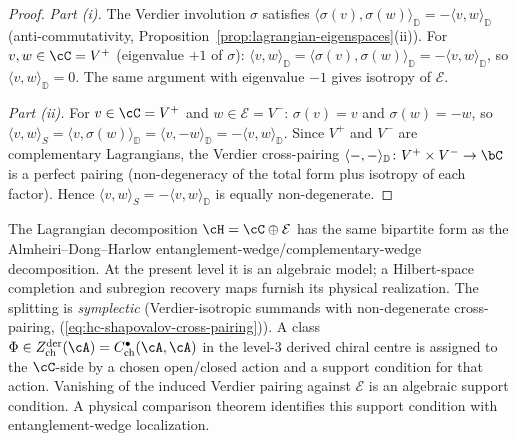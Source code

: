 \begin{proof}
\emph{Part (i).}
The Verdier involution $\sigma$ satisfies
$\langle \sigma(v), \sigma(w) \rangle_{\mathbb{D}} =
-\langle v, w \rangle_{\mathbb{D}}$
(anti-commutativity,
Proposition~\ref{prop:lagrangian-eigenspaces}(ii)).
For $v, w \in \cC = V^+$ (eigenvalue $+1$ of $\sigma$):
$\langle v, w \rangle_{\mathbb{D}} =
\langle \sigma(v), \sigma(w) \rangle_{\mathbb{D}} =
-\langle v, w \rangle_{\mathbb{D}}$,
so $\langle v, w \rangle_{\mathbb{D}} = 0$.
The same argument with eigenvalue $-1$ gives
isotropy of $\mathcal E$.

\emph{Part (ii).}
For $v \in \cC = V^+$ and $w \in \mathcal E = V^-$:
$\sigma(v) = v$ and $\sigma(w) = -w$, so
$\langle v, w \rangle_S = \langle v, \sigma(w)
\rangle_{\mathbb{D}} = \langle v, -w \rangle_{\mathbb{D}}
= -\langle v, w \rangle_{\mathbb{D}}$.
Since $V^+$ and $V^-$ are complementary Lagrangians,
the Verdier cross-pairing
$\langle -, - \rangle_{\mathbb{D}}\colon V^+ \times V^- \to \bC$
is a perfect pairing
\textup{(}non-degeneracy of the total form plus isotropy
of each factor\textup{)}.
Hence $\langle v, w \rangle_S = -\langle v, w \rangle_{\mathbb{D}}$
is equally non-degenerate.
\end{proof}

\begin{remark}
\label{rem:hc-adh-comparison}
The Lagrangian decomposition
$\cH = \cC \oplus \mathcal E$
has the same bipartite form as the
Almheiri--Dong--Harlow \cite{Almheiri-Dong-Harlow15}
entanglement-wedge/complementary-wedge decomposition.  At the present
level it is an algebraic model; a Hilbert-space completion and
subregion recovery maps furnish its physical realization.
The splitting is \emph{symplectic} (Verdier-isotropic
summands with non-degenerate cross-pairing,
\textup{(\ref{eq:hc-shapovalov-cross-pairing})}).
A class
$\Phi\in Z^{\mathrm{der}}_{\mathrm{ch}}(\cA) =
C^\bullet_{\mathrm{ch}}(\cA,\cA)$
in the level-$3$ derived chiral centre is assigned to the $\cC$-side
by a chosen open/closed action and a support condition for that action.
Vanishing of the induced Verdier
pairing against $\mathcal E$ is an algebraic support condition.  A
physical comparison theorem identifies this support condition with
entanglement-wedge localization.
\end{remark}

